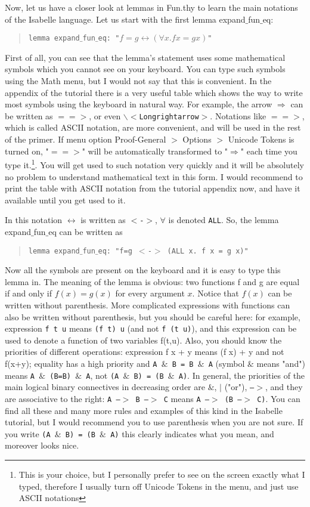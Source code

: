 \documentclass[11pt]{article}
\newcommand{\prog}[1]{\par\noindent\begin{quote}#1\end{quote}\par\noindent}
\begin{document}
Now, let us have a closer look at lemmas in Fun.thy to learn the main notations of the Isabelle language. Let us start with the first lemma expand$\_$fun$\_$eq:

\prog{\tt lemma expand$\_$fun$\_$eq: "$f = g \leftrightarrow (\forall x. f x = g x)$"}%

First of all, you can see that the lemma's statement uses some mathematical symbols which you cannot see on your keyboard. You can type such symbols using the Math menu, but I would not say that this is convenient. In the appendix of the tutorial there is a very useful table which shows the way to write most symbols using the keyboard in natural way. For example, the arrow {\tt $\Longrightarrow$} can be written as {\tt $==>$}, or even {\tt $\backslash$$<$Longrightarrow$>$}. Notations like {\tt $==>$}, which is called ASCII notation, are more convenient, and will be used in the rest of the primer.
If menu option Proof-General $>$ Options $>$ Unicode Tokens is turned on, "$==>$" will be automatically transformed to "$\Longrightarrow$" each time you type it.\footnote{This is your choice, but I personally prefer to see on the screen exactly what I typed, therefore I usually turn off Unicode Tokens in the menu, and just use ASCII notations}. You will get used to such notation very quickly and it will be absolutely no problem to understand mathematical text in this form.
I would recommend to print the table with ASCII notation from the tutorial appendix now, and have it available until you get used to it.

In this notation {\tt $\leftrightarrow$} is written as {\tt $<$-$>$}, {\tt $\forall$} is denoted {\tt ALL}. So, the lemma expand$\_$fun$\_$eq can be written as

\prog{\tt lemma expand$\_$fun$\_$eq: "f=g $<$-$>$ (ALL x. f x = g x)"}%

Now all the symbols are present on the keyboard and it is easy to type this lemma in. The meaning of the lemma is obvious: two functions f and g are equal if and only if $f(x)=g(x)$ for every argument $x$. Notice that $f(x)$ can be written without parenthesis. More complicated expressions with functions can also be written without parenthesis, but you should be careful here: for example, expression {\tt f t u} means {\tt (f t) u} (and not {\tt f (t u)}), and this expression can be used to denote a function of two variables f(t,u). Also, you should know the priorities of different operations: expression f x + y means (f x) + y and not f(x+y); equality has a high priority and {\tt A $\&$ B = B $\&$ A} (symbol {\tt $\&$} means "and") means {\tt A $\&$ (B=B) $\&$ A}, not {\tt (A $\&$ B) = (B $\&$ A)}. In general, the priorities of the main logical binary connectives in decreasing order are {\tt  $\&$}, {\tt $|$} ("or"), {\tt --$>$}, and they are associative to the right: {\tt A --$>$ B --$>$ C} means {\tt A --$>$ (B --$>$ C)}. You can find all these and many more rules and examples of this kind in the Isabelle tutorial, but I would recommend you to use parenthesis when you are not sure. If you write {\tt (A $\&$ B) = (B $\&$ A)} this clearly indicates what you mean, and moreover looks nice.
\end{document}
